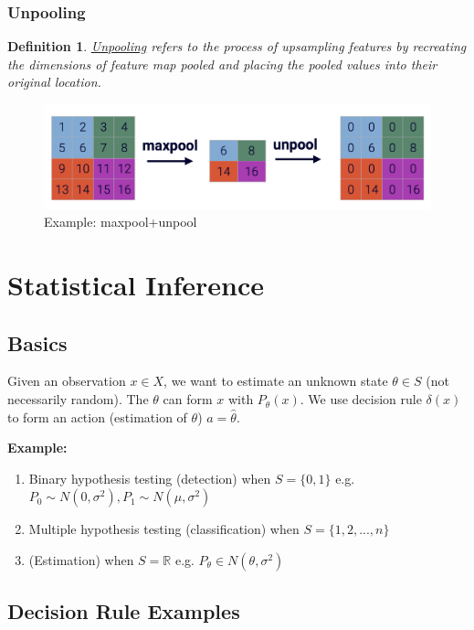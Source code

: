 \documentclass[11pt,a4paper]{article}
\newtheorem{definition}{Definition}
\begin{document}
\subsubsection{Unpooling}
\begin{definition}
    \underline{Unpooling} refers to the process of upsampling features by recreating the dimensions of feature map pooled and placing the pooled values into their original location.
\end{definition}
\begin{center}\begin{figure}[htbp]
    \centering
    \includegraphics[scale=0.1]{unpool.png}
    \caption{Example: maxpool+unpool}
    \label{}
\end{figure}\end{center}



\section{Statistical Inference}

\subsection{Basics}
Given an observation $x\in X$, we want to estimate an unknown state $\theta \in S$ (not necessarily random). The $\theta$ can form $x$ with $P_\theta(x)$. We use decision rule $\delta (x)$ to form an action (estimation of $\theta$) $a=\hat{\theta}$.

\textbf{Example:}
\begin{enumerate}[(1)]
    \item Binary hypothesis testing (detection) when $S=\{0,1\}$ e.g. $P_0\sim N(0,\sigma^2), P_1\sim N(\mu,\sigma^2)$
    \item Multiple hypothesis testing (classification) when $S=\{1,2,...,n\}$
    \item (Estimation) when $S=\mathbb{R}$ e.g. $P_\theta\in N(\theta,\sigma^2)$
\end{enumerate}

\subsection{Decision Rule Examples}
\end{document}
